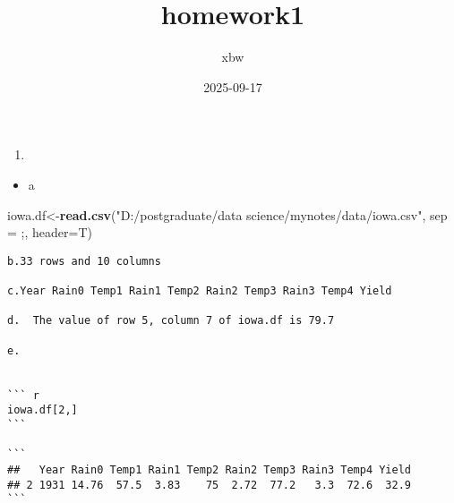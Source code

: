\documentclass[
]{article}
\title{homework1}
\author{xbw}
\date{2025-09-17}
\newenvironment{Shaded}{\begin{snugshade}}{\end{snugshade}}
\newcommand{\AttributeTok}[1]{\textcolor[rgb]{0.13,0.29,0.53}{#1}}
\newcommand{\FunctionTok}[1]{\textcolor[rgb]{0.13,0.29,0.53}{\textbf{#1}}}
\newcommand{\NormalTok}[1]{#1}
\newcommand{\OtherTok}[1]{\textcolor[rgb]{0.56,0.35,0.01}{#1}}
\newcommand{\StringTok}[1]{\textcolor[rgb]{0.31,0.60,0.02}{#1}}
\providecommand{\tightlist}{%
  \setlength{\itemsep}{0pt}\setlength{\parskip}{0pt}}
\begin{document}
\maketitle

\begin{enumerate}
\def\labelenumi{\arabic{enumi}.}
\tightlist
\item
\end{enumerate}

\begin{itemize}
\tightlist
\item
  a
\end{itemize}

\begin{Shaded}
\begin{Highlighting}[]
\NormalTok{ iowa.df}\OtherTok{\textless{}{-}}\FunctionTok{read.csv}\NormalTok{(}\StringTok{"D:/postgraduate/data science/mynotes/data/iowa.csv"}\NormalTok{, }\AttributeTok{sep =} \StringTok{\textquotesingle{};\textquotesingle{}}\NormalTok{, }\AttributeTok{header=}\NormalTok{T)}
\end{Highlighting}
\end{Shaded}

\begin{verbatim}
b.33 rows and 10 columns

c.Year Rain0 Temp1 Rain1 Temp2 Rain2 Temp3 Rain3 Temp4 Yield

d.  The value of row 5, column 7 of iowa.df is 79.7

e.  


``` r
iowa.df[2,]
```

```
##   Year Rain0 Temp1 Rain1 Temp2 Rain2 Temp3 Rain3 Temp4 Yield
## 2 1931 14.76  57.5  3.83    75  2.72  77.2   3.3  72.6  32.9
```
\end{verbatim}
\end{document}
